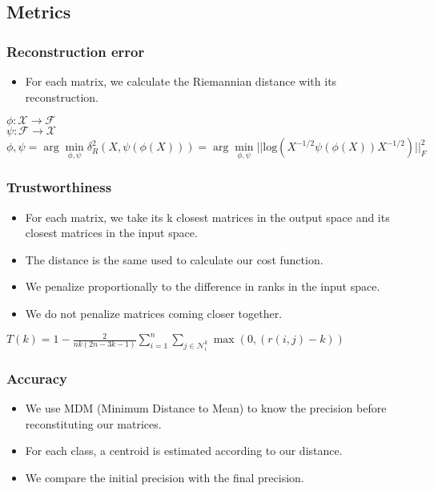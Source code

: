 \documentclass{beamer}
\begin{document}
\subsection{Metrics}
\begin{frame}
    \frametitle{Reconstruction error}
    \begin{itemize}
        \item For each matrix, we calculate the Riemannian distance with its reconstruction.
    \end{itemize}
    \begin{center}
        $ \phi : \mathcal{X} \rightarrow \mathcal{F}$ \\
        $ \psi : \mathcal{F} \rightarrow \mathcal{X}$ \\
        $ \phi,\psi = \arg\min\limits_{\phi,\psi} \delta^2_R(X,\psi (\phi(X))) =  \arg \min\limits_{\phi,\psi} ||\text{log}(X^{-1/2}\psi (\phi(X))X^{-1/2})||^2_F$
    \end{center}
    \end{frame}
\begin{frame}
\frametitle{Trustworthiness}
\begin{itemize}
    \item For each matrix, we take its k closest matrices in the output space and its closest matrices in the input space.
    \item The distance is the same used to calculate our cost function.
    \item We penalize proportionally to the difference in ranks in the input space.
    \item We do not penalize matrices coming closer together.
\end{itemize}
\begin{center}
    $ T(k) = 1 - \frac{2}{nk(2n-3k-1)} \sum\limits_{i=1}^n\sum\limits_{j\in\mathcal{N}_i^k} \max(0,(r(i,j)-k)) $
\end{center}
\end{frame}
\begin{frame}
\frametitle{Accuracy}
\begin{itemize}
    \item We use MDM (Minimum Distance to Mean) to know the precision before reconstituting our matrices.
    \item For each class, a centroid is estimated according to our distance.
    \item We compare the initial precision with the final precision.
\end{itemize}
\end{frame}
\end{document}
